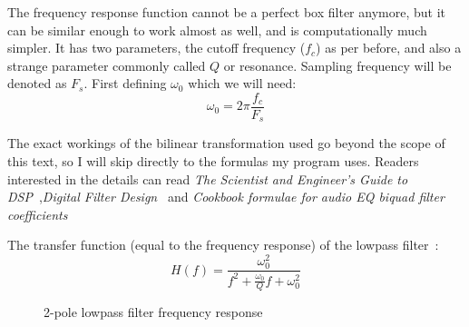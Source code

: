 \documentclass[11pt,a4paper]{article}
\begin{document}
The frequency response function cannot be a perfect box filter anymore, but it can be similar enough to work almost as well, and is computationally much simpler.
It has two parameters, the cutoff frequency (\(f_c\)) as per before, and also a strange parameter commonly called \(Q\) or resonance.
Sampling frequency will be denoted as \(F_s\).
First defining $\omega_0$ which we will need:
\begin{equation}
\omega_0 = 2{\pi}\frac{f_c}{F_s}
\end{equation}

The exact workings of the bilinear transformation used go beyond the scope of this text, so I will skip directly to the formulas my program uses. Readers interested in the details can read \emph{The Scientist and Engineer's Guide to DSP}~\cite[chap. 33]{SmithDSP},\emph{Digital Filter Design}~\cite[chap. 3.5]{ZoranDFD} and \emph{Cookbook formulae for audio EQ biquad filter coefficients}~\cite{Cookbook}

The transfer function (equal to the frequency response) of the lowpass filter~\cite[section 8.2]{LinearCircuit}:
\begin{equation}
H(f) = \frac{\omega_0^2}{f^2 + \frac{\omega_0}{Q}f + \omega_0^2}
\end{equation}



\begin{figure}[ht]
\caption{2-pole lowpass filter frequency response}
\centering
{}

\end{figure}
\end{document}
